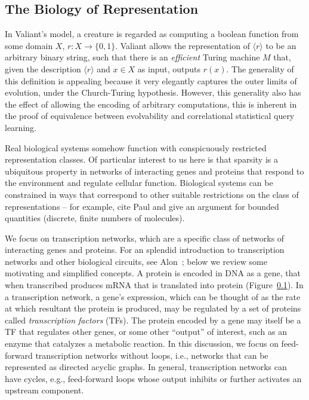 \subsection{The Biology of Representation}

In Valiant's model, a creature is regarded as computing a boolean function from
some domain $X$, $r : X \rightarrow \{0, 1\}$. Valiant allows the representation
of $\langle r \rangle$ to be an arbitrary binary string, such that there is an
\emph{efficient} Turing machine $M$ that, given the description $\langle r
\rangle$ and $x \in X$ as input, outputs $r(x)$. The generality of this
definition is appealing because it very elegantly captures the outer limits of
evolution, under the Church-Turing hypothesis. However, this generality also has
the effect of allowing the encoding of arbitrary computations, this is
inherent in the proof of equivalence between evolvability and correlational
statistical query learning.

Real biological systems somehow function with conspicuously restricted
representation classes. Of particular interest to us here is that sparsity is a
ubiquitous property in networks of interacting genes and proteins that respond
to the environment and regulate cellular function.
Biological systems can be constrained in ways that correspond to other suitable
restrictions on the class of representations -- for example, cite Paul and give
an argument for bounded quantities (discrete, finite numbers of molecules).

We focus on transcription networks, which are a specific class of
networks of interacting genes and proteins. For an splendid introduction to
transcription networks and other biological circuits, see Alon~\cite{alon};
below we review some motivating and simplified concepts.
A protein is encoded in DNA as a gene, that when transcribed produces mRNA
that is translated into protein (Figure~\ref{}).
In a transcription network, a gene's expression, which can be
thought of as the rate at which resultant the protein is produced,
may be regulated by a set of proteins called \emph{transcription factors} (TFs).
The protein encoded by a gene may itself be a TF that regulates other genes,
or some other ``output'' of interest, such as an enzyme that catalyzes a
metabolic reaction.
In this discussion, we focus on feed-forward transcription networks without
loops, i.e., networks that can be represented as directed acyclic graphs.
In general, transcription networks can have cycles, e.g., feed-forward loops
whose output inhibits or further activates an upstream component.

